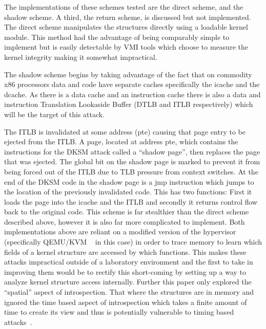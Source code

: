The implementations of these schemes tested are the direct scheme, and the shadow scheme. A third, the return scheme, is discussed but not implemented. The direct scheme manipulates the structures directly using a loadable kernel module. This method had the advantage of being comparably simple to implement but is easily detectable by VMI tools which choose to measure the kernel integrity making it somewhat impractical. 

The shadow scheme begins by taking advantage of the fact that on commodity x86 processors data and code have separate caches specifically the icache and the dcache. As there is a data cache and an instruction cache there is also a data and instruction Translation Lookaside Buffer (DTLB and ITLB respectively) which will be the target of this attack. 

The ITLB is invalidated at some address (pte) causing that page entry to be ejected from the ITLB. A page, located at address pte, which contains the instructions for the DKSM attack called a ``shadow page'', then replaces the page that was ejected. The global bit on the shadow page is marked to prevent it from being forced out of the ITLB due to TLB pressure from context switches. At the end of the DKSM code in the shadow page is a jmp instruction which jumps to the location of the previously invalidated code. This has two functions: First it loads the page into the icache and the ITLB and secondly it returns control flow back to the original code. This scheme is far stealthier than the direct scheme described above, however it is also far more complicated to implement. Both implementations above are reliant on a modified version of the hypervisor (specifically QEMU/KVM ~\cite{bellard_qemu_2005} in this case) in order to trace memory to learn which fields of a kernel structure are accessed by which functions. This makes these attacks impractical outside of a laboratory environment and the first to take in improving them would be to rectify this short-coming by setting up a way to analyze kernel structure access internally. Further this paper only explored the ``spatial'' aspect of introspection. That where the structures are in memory and ignored the time based aspect of introspection which takes a finite amount of time to create its view and thus is potentially vulnerable to timing based attacks~\cite{bahram_dksm:_2010}. 
